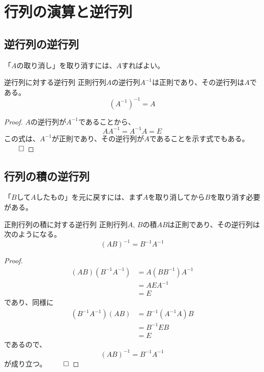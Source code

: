 \documentclass[../../../topic_linear-algebra]{subfiles}
\begin{document}
\sectionline
\section{行列の演算と逆行列}

\subsection{逆行列の逆行列}

「$A$の取り消し」を取り消すには、$A$すればよい。

\begin{theorem}{逆行列に対する逆行列}\label{thm:inverse-of-inverse}
  正則行列$A$の逆行列$A^{-1}$は正則であり、その逆行列は$A$である。
  \begin{equation*}
    (A^{-1})^{-1} = A
  \end{equation*}
\end{theorem}

\begin{proof}
  $A$の逆行列が$A^{-1}$であることから、
  \begin{equation*}
    AA^{-1} = A^{-1}A = E
  \end{equation*}
  この式は、$A^{-1}$が正則であり、その逆行列が$A$であることを示す式でもある。 $\qed$
\end{proof}

\subsection{行列の積の逆行列}

「$B$して$A$したもの」を元に戻すには、まず$A$を取り消してから$B$を取り消す必要がある。

\begin{theorem}{正則行列の積に対する逆行列}\label{thm:inverse-of-product}
  正則行列$A,\,B$の積$AB$は正則であり、その逆行列は次のようになる。
  \begin{equation*}
    (AB)^{-1} = B^{-1} A^{-1}
  \end{equation*}
\end{theorem}

\begin{proof}
  \begin{align*}
    (AB)(B^{-1} A^{-1}) & = A(B B^{-1}) A^{-1} \\
                        & = A E A^{-1}         \\
                        & = E
  \end{align*}
  であり、同様に
  \begin{align*}
    (B^{-1} A^{-1})(AB) & = B^{-1} (A^{-1} A) B \\
                        & = B^{-1} E B          \\
                        & = E
  \end{align*}
  であるので、
  \begin{equation*}
    (AB)^{-1} = B^{-1} A^{-1}
  \end{equation*}
  が成り立つ。 $\qed$
\end{proof}
\end{document}
